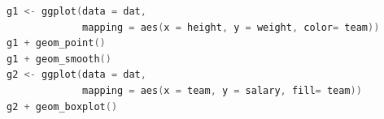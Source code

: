 \begin{lstlisting}[language=c++,label={code:05_exe2},caption={Attempting to draw various graphs}]
g1 <- ggplot(data = dat, 
             mapping = aes(x = height, y = weight, color= team))
g1 + geom_point()
g1 + geom_smooth() 
g2 <- ggplot(data = dat, 
             mapping = aes(x = team, y = salary, fill= team))
g2 + geom_boxplot()
\end{lstlisting}
